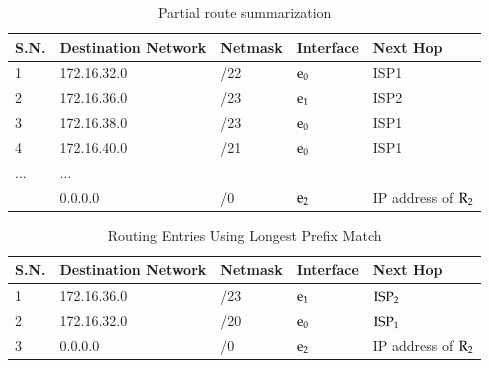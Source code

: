 \begin{table}[H]
\caption{Partial route summarization}\label{chap2-table-7}
\begin{center}
\begin{tabular}{|l|l|l|l|l|}
\hline
\textbf{S.N.} & \textbf{Destination Network} & \textbf{Netmask} & \textbf{Interface} & \textbf{Next Hop}\\
\hline
1 & 172.16.32.0 & /22 & ${\rm e}_{0}$ & ISP1\\
\hline
2 & 172.16.36.0 & /23 & ${\rm e}_{1}$ & ISP2\\
\hline
3 & 172.16.38.0 & /23 & ${\rm e}_{0}$ & ISP1\\
\hline
4 &  172.16.40.0 &  /21 & ${\rm e}_{0}$ & ISP1\\
\hline
$\ldots$ & $\ldots$ & & &\\
\hline
 & 0.0.0.0 & /0 & ${\rm e}_{2}$ & IP address of ${\rm R}_{2}$\\
\hline
\end{tabular}
\end{center}
\end{table}

\vskip -1.2cm

\begin{table}[H]
\caption{Routing Entries Using Longest Prefix Match}\label{chap2-table-8}
\begin{center}
\begin{tabular}{|l|l|l|l|l|}
\hline
\textbf{S.N.} & \textbf{Destination Network} & \textbf{Netmask} & \textbf{Interface} & \textbf{Next Hop}\\
\hline
1 & 172.16.36.0 & /23 & ${\rm e}_{1}$ & ${\rm ISP}_{2}$\\
\hline
2 & 172.16.32.0 & /20 & ${\rm e}_{0}$ & ${\rm ISP}_{1}$\\
\hline
3 & 0.0.0.0 & /0 & ${\rm e}_{2}$ & IP address of ${\rm R}_{2}$\\
\hline
\end{tabular}
\end{center}
\end{table}

\vspace{-1cm}

